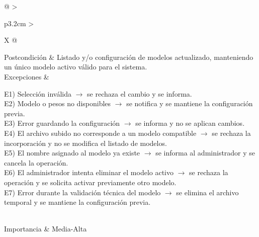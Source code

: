 \begin{table}[]
\begin{tabularx}{\textwidth}{@{}
			>{\raggedright\arraybackslash}p{3.2cm}
			>{\raggedright\arraybackslash}X
			@{}}
		Postcondición &
		Listado y/o configuración de modelos actualizado, manteniendo un único modelo activo válido para el sistema. \\
		
		Excepciones &
		\begin{minipage}[t]{\linewidth}
			\vspace{-\baselineskip}
			E1) Selección inválida $\rightarrow$ se rechaza el cambio y se informa.\\
			E2) Modelo o pesos no disponibles $\rightarrow$ se notifica y se mantiene la configuración previa.\\
			E3) Error guardando la configuración $\rightarrow$ se informa y no se aplican cambios.\\
			E4) El archivo subido no corresponde a un modelo compatible $\rightarrow$ se rechaza la incorporación y no se modifica el listado de modelos.\\
			E5) El nombre asignado al modelo ya existe $\rightarrow$ se informa al administrador y se cancela la operación.\\
			E6) El administrador intenta eliminar el modelo activo $\rightarrow$ se rechaza la operación y se solicita activar previamente otro modelo.\\
			E7) Error durante la validación técnica del modelo $\rightarrow$ se elimina el archivo temporal y se mantiene la configuración previa.
		\end{minipage} \\
		
		Importancia &
		Media-Alta \\
		\bottomrule
	\end{tabularx}
\end{table}

